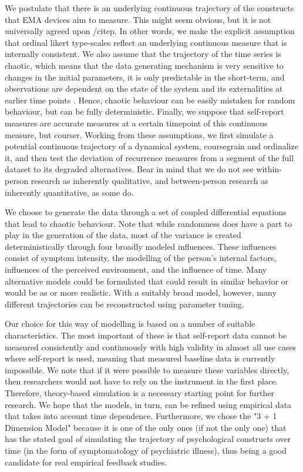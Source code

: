 \documentclass[utf8]{FrontiersinVancouver}
\begin{document}
We postulate that there is an underlying continuous trajectory of the constructs that EMA devices aim to measure. This might seem obvious, but it is not universally agreed upon /citep{}. In other words, we make the explicit assumption that ordinal likert type-scales reflect an underlying continuous measure that is internally consistent. We also assume that the trajectory of the time series is chaotic, which means that the data generating mechanism is very sensitive to changes in the initial parameters, it is only predictable in the short-term, and observations are dependent on the state of the system and its externalities at earlier time points \citep{olthofComplexityPsychologicalSelfratings2020b}. Hence, chaotic behaviour can be easily mistaken for random behaviour, but can be fully deterministic. Finally, we suppose that self-report measures are accurate measures at a certain timepoint of this continuous measure, but courser. Working from these assumptions, we first simulate a potential continuous trajectory of a dynamical system, coursegrain and ordinalize it, and then test the deviation of recurrence measures from a segment of the full dataset to its degraded alternatives. Bear in mind that we do not see within-person research as inherently qualitative, and between-person research as inherently quantitative, as some do. 

We choose to generate the data through a set of coupled differential equations that lead to chaotic behaviour. Note that while randomness does have a part to play in the generation of the data, most of the variance is created deterministically through four broadly modeled influences. These influences consist of symptom intensity, the modelling of the person's internal factors, influences of the perceived environment, and the influence of time. Many alternative models could be formulated that could result in similar behavior or would be as or more realistic. With a suitably broad model, however, many different trajectories can be reconstructed using parameter tuning. 

Our choice for this way of modelling is based on a number of suitable characteristics. The most important of these is that self-report data cannot be measured consistently and continuously with high validity in almost all use cases where self-report is used, meaning that measured baseline data is currently impossible. We note that if it were possible to measure these variables directly, then researchers would not have to rely on the instrument in the first place. Therefore, theory-based simulation is a necessary starting point for further research. We hope that the models, in turn, can be refined using empirical data that takes into account time dependence. Furthermore, we chose the "3 + 1 Dimension Model" because it is one of the only ones (if not the only one) that has the stated goal of simulating the trajectory of psychological constructs over time (in the form of symptomatology of psychiatric illness), thus being a good candidate for real empirical feedback studies.
\end{document}
